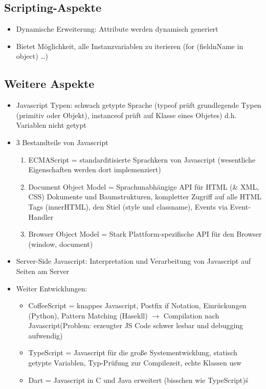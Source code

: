 \documentclass{article} %
\begin{document}
	\subsection{Scripting-Aspekte}
	\begin{itemize}
		\item Dynamische Erweiterung: Attribute werden dynamisch generiert
		\item Bietet Möglichkeit, alle Instanzvariablen zu iterieren (for (fieldnName in object) \dots)
	\end{itemize}
	\subsection{Weitere Aspekte}
	\begin{itemize}
		\item Javascript Typen: schwach getypte Sprache (typeof prüft grundlegende Typen (primitiv oder Objekt), instanceof prüft auf Klasse eines Objetes) d.h. Variablen nicht getypt
		\item 3 Bestandteile von Javascript
		\begin{enumerate}
			\item ECMAScript = standarditisierte Sprachkern von Javascript (wesentliche Eigenschaften werden dort implemenziert)
			\item Document Object Model = Sprachunabhängige API für HTML (\& XML, CSS) Dokumente und Baumstrukturen, kompletter Zugriff auf alle HTML Tags (innerHTML), den Stiel (style und classname), Events via Event-Handler
			\item Browser Object Model = Stark Plattform-spezifische API für den Browser (window, document)
		\end{enumerate}
		\item Server-Side Javascript: Interpretation und Verarbeitung von Javascript auf Seiten am Server
		\item Weiter Entwicklungen:
		\begin{itemize}
			\item CoffeeScript = knappes Javascript, Postfix if Notation, Einrückungen (Python), Pattern Matching (Hasekll) $\rightarrow$ Compilation nach Javascript(Problem: erzeugter JS Code schwer lesbar und debugging aufwendig)
			\item TypeScript = Javascript für die große Systementwicklung, statisch getypte Variablen, Typ-Prüfung zur Compilezeit, echte Klassen usw
			\item Dart = Javascript in C und Java erweitert (bisschen wie TypeScript)ś
		\end{itemize}
	\end{itemize}
\end{document}
